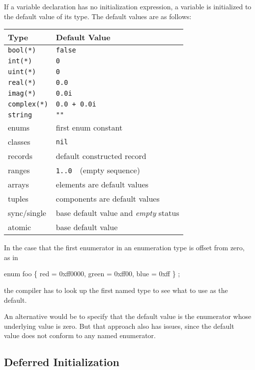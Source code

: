 If a variable declaration has no initialization expression, a variable
is initialized to the default value of its type.  The default values
are as follows:
\begin{center}
\begin{tabular}{|l|l|}
\hline
{\bf Type} & {\bf Default Value} \\
\hline
{\tt bool(*)} & {\tt false} \\
{\tt int(*)} & {\tt 0} \\
{\tt uint(*)} & {\tt 0} \\
{\tt real(*)} & {\tt 0.0} \\
{\tt imag(*)} & {\tt 0.0i} \\
{\tt complex(*)} & {\tt 0.0 + 0.0i} \\
{\tt string} & {\tt ""} \\
enums & first enum constant \\
classes & {\tt nil} \\
records & default constructed record \\
ranges & {\tt 1..0} $ $ $ $ (empty sequence) \\
arrays & elements are default values \\
tuples & components are default values \\
sync/single & base default value and \emph{empty} status \\
atomic & base default value \\
\hline
\end{tabular}
\end{center}

\begin{openissue}
In the case that the first enumerator in an enumeration type is offset
from zero, as in
\begin{example}
enum foo \{ red = 0xff0000, green = 0xff00, blue = 0xff \} ;
\end{example}
the compiler has to look up the first named type to see what to use as
the default.  

An alternative would be to specify that the default
value is the enumerator whose underlying value is zero.  But that approach also
has issues, since the default value does not conform to any named enumerator.
\end{openissue}

\subsection{Deferred Initialization}
\label{Noinit_Capability}

